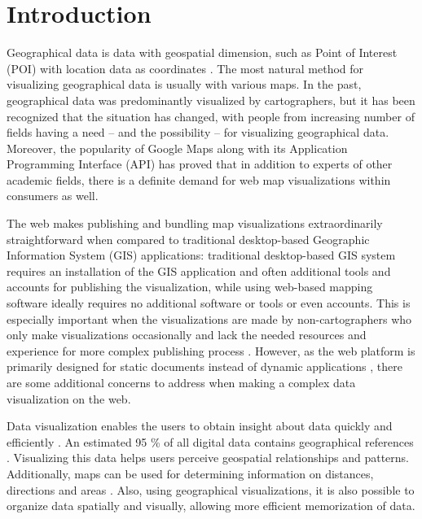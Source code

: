 
\chapter{Introduction}
\label{chapter:intro}


Geographical data is data with geospatial dimension, such as Point of Interest (POI) with location data as coordinates \citep[chap.~1.2]{kraak_cartography_2011}. The most natural method for visualizing geographical data is usually with various maps. In the past, geographical data was predominantly visualized by cartographers, but it has been recognized \citep{kraak_visualization_1999} that the situation has changed, with people from increasing number of fields having a need -- and the possibility \citep[chap.~1]{slocum_thematic_2014} -- for visualizing geographical data. Moreover, the popularity of Google Maps \citep{google_maps_2005-1} along with its Application Programming Interface (API) \citep{google_maps_2005} has proved that in addition to experts of other academic fields, there is a definite demand for web map visualizations within consumers as well. 

The web makes publishing and bundling map visualizations extraordinarily straightforward when compared to traditional desktop-based Geographic Information System (GIS) applications: traditional desktop-based GIS system requires an installation of the GIS application and often additional tools and accounts for publishing the visualization, while using web-based mapping software ideally requires no additional software or tools or even accounts. This is especially important when the visualizations are made by non-cartographers who only make visualizations occasionally and lack the needed resources and experience for more complex publishing process \citep{miller_beast_2006}. However, as the web platform is primarily designed for static documents \citep{berners-lee_information_1989,berners-lee_world-wide_1992} instead of dynamic applications \citep{jazayeri_trends_2007}, there are some additional concerns to address when making a complex data visualization on the web.

Data visualization enables the users to obtain insight about data quickly and efficiently \citep{van_wijk_value_2005}. An estimated 95 \% of all digital data contains geographical references \citep{perkins_have_2010}. Visualizing this data helps users perceive geospatial relationships and patterns. Additionally, maps can be used for determining information on distances, directions and areas \citep[chap.~1.1]{kraak_cartography_2011}. Also, using geographical visualizations, it is also possible to organize data spatially and visually, allowing more efficient memorization of data.

